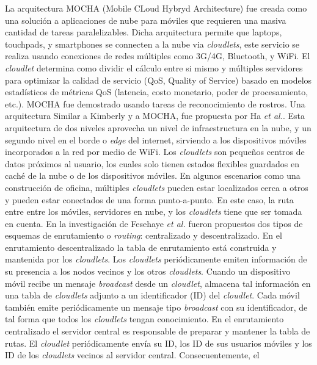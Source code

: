 La arquitectura MOCHA \cite{soyata2013accelerating} (Mobile CLoud Hybryd Architecture) fue creada como una solución a aplicaciones de nube para móviles que requieren
una masiva cantidad de tareas paralelizables. Dicha arquitectura permite que laptops, touchpads, y smartphones se connecten a la nube 
via \textit{cloudlets}, este servicio se realiza usando conexiones de redes múltiples como 3G/4G, Bluetooth, y WiFi. El \textit{cloudlet}
determina como dividir el cálculo entre si mismo y múltiples servidores para optimizar la calidad de servicio (QoS, Quality of Service) 
basado en modelos estadísticos de métricas QoS (latencia, costo monetario, poder de procesamiento, etc.). MOCHA fue demostrado usando 
tareas de reconocimiento de rostros. 
Una arquitectura Similar a Kimberly y a MOCHA, fue propuesta por Ha \textit{et al.}. Esta arquitectura de dos niveles aprovecha un nivel 
de infraestructura en la nube, y un segundo nivel en el borde o \textit{edge} del internet, sirviendo a los dispositivos móviles incorporados 
a la red por medio de WiFi. Los \textit{cloudlets} son pequeños centros de datos próximos al usuario, los cuales solo 
tienen estados flexibles guardados en caché de la nube o de los dispositivos móviles. 
En algunos escenarios como una construcción de oficina, múltiples \textit{cloudlets} pueden estar localizados cerca a otros y pueden estar 
conectados de una forma punto-a-punto. En este caso, la ruta entre entre los móviles, servidores en nube, y los \textit{cloudlets} tiene
que ser tomada en cuenta. En la investigación de Fesehaye \textit{et al.} \cite{6337243} fueron propuestos dos tipos de esquemas de 
enrutamiento o \textit{routing}: centralizado y descentralizado. En el enrutamiento descentralizado la tabla de enrutamiento está 
construida y mantenida por los \textit{cloudlets}. Los \textit{cloudlets} periódicamente emiten información de su presencia a los nodos
vecinos y los otros \textit{cloudlets}. Cuando un dispositivo móvil recibe un mensaje \textit{broadcast} desde un \textit{cloudlet}, 
almacena tal información en una tabla de \textit{cloudlets} adjunto a un identificador (ID) del \textit{cloudlet}. Cada móvil también emite 
periódicamente un mensaje tipo \textit{broadcast} con su identificador, de tal forma que todos los \textit{cloudlets} tengan conocimiento. En 
el enrutamiento centralizado el servidor central es responsable de preparar y mantener la tabla de rutas. El \textit{cloudlet} periódicamente
envía su ID, los ID de sus usuarios móviles y los ID de los \textit{cloudlets} vecinos al servidor central. Consecuentemente, el
